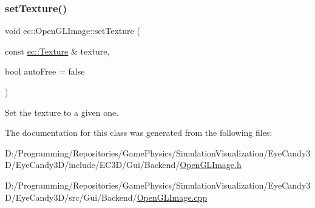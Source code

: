 \subsubsection{\texorpdfstring{set\+Texture()}{setTexture()}}
{\footnotesize\ttfamily void ec\+::\+Open\+G\+L\+Image\+::set\+Texture (\begin{DoxyParamCaption}\item[{const \mbox{\hyperlink{classec_1_1_texture}{ec\+::\+Texture}} \&}]{texture,  }\item[{bool}]{auto\+Free = {\ttfamily false} }\end{DoxyParamCaption})}

Set the texture to a given one. 

The documentation for this class was generated from the following files\+:\begin{DoxyCompactItemize}
\item 
D\+:/\+Programming/\+Repositories/\+Game\+Physics/\+Simulation\+Visualization/\+Eye\+Candy3\+D/\+Eye\+Candy3\+D/include/\+E\+C3\+D/\+Gui/\+Backend/\mbox{\hyperlink{_open_g_l_image_8h}{Open\+G\+L\+Image.\+h}}\item 
D\+:/\+Programming/\+Repositories/\+Game\+Physics/\+Simulation\+Visualization/\+Eye\+Candy3\+D/\+Eye\+Candy3\+D/src/\+Gui/\+Backend/\mbox{\hyperlink{_open_g_l_image_8cpp}{Open\+G\+L\+Image.\+cpp}}\end{DoxyCompactItemize}
